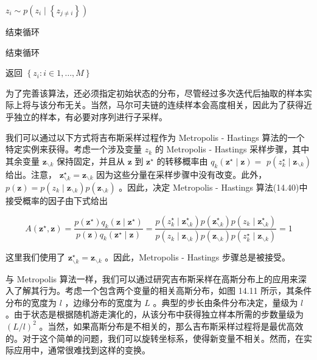 \documentclass[10pt]{article}
\begin{document}
\({z}_{i} \sim  p\left( {{z}_{i} \mid  \left\{  {z}_{j \neq  i}\right\}  }\right)\)

结束循环

结束循环

返回 \(\left\{  {{z}_{i} : i \in  1,\ldots ,M}\right\}\)

为了完善该算法，还必须指定初始状态的分布，尽管经过多次迭代后抽取的样本实际上将与该分布无关。当然，马尔可夫链的连续样本会高度相关，因此为了获得近乎独立的样本，有必要对序列进行子采样。

我们可以通过以下方式将吉布斯采样过程作为 Metropolis - Hastings 算法的一个特定实例来获得。考虑一个涉及变量 \({z}_{k}\) 的 Metropolis - Hastings 采样步骤，其中其余变量 \({\mathbf{z}}_{\smallsetminus k}\) 保持固定，并且从 \(\mathbf{z}\) 到 \({\mathbf{z}}^{ \star  }\) 的转移概率由 \({q}_{k}\left( {{\mathbf{z}}^{ \star  } \mid  \mathbf{z}}\right)  =\)  \(p\left( {{z}_{k}^{ \star  } \mid  {\mathbf{z}}_{\smallsetminus k}}\right)\) 给出。注意， \({\mathbf{z}}_{\smallsetminus k}^{ \star  } = {\mathbf{z}}_{\smallsetminus k}\) 因为这些分量在采样步骤中没有改变。此外， \(p\left( \mathbf{z}\right)  = p\left( {{z}_{k} \mid  {\mathbf{z}}_{\smallsetminus k}}\right) p\left( {\mathbf{z}}_{\smallsetminus k}\right)\) 。因此，决定 Metropolis - Hastings 算法(14.40)中接受概率的因子由下式给出

\[
A\left( {{\mathbf{z}}^{ \star  },\mathbf{z}}\right)  = \frac{p\left( {\mathbf{z}}^{ \star  }\right) {q}_{k}\left( {\mathbf{z} \mid  {\mathbf{z}}^{ \star  }}\right) }{p\left( \mathbf{z}\right) {q}_{k}\left( {{\mathbf{z}}^{ \star  } \mid  \mathbf{z}}\right) } = \frac{p\left( {{z}_{k}^{ \star  } \mid  {\mathbf{z}}_{\smallsetminus k}^{ \star  }}\right) p\left( {\mathbf{z}}_{\smallsetminus k}^{ \star  }\right) p\left( {{z}_{k} \mid  {\mathbf{z}}_{\smallsetminus k}^{ \star  }}\right) }{p\left( {{z}_{k} \mid  {\mathbf{z}}_{\smallsetminus k}}\right) p\left( {\mathbf{z}}_{\smallsetminus k}\right) p\left( {{z}_{k}^{ \star  } \mid  {\mathbf{z}}_{\smallsetminus k}}\right) } = 1 \tag{14.45}
\]

这里我们使用了 \({\mathbf{z}}_{\smallsetminus k}^{ \star  } = {\mathbf{z}}_{\smallsetminus k}\) 。因此，Metropolis - Hastings 步骤总是被接受。

与 Metropolis 算法一样，我们可以通过研究吉布斯采样在高斯分布上的应用来深入了解其行为。考虑一个包含两个变量的相关高斯分布，如图 14.11 所示，其条件分布的宽度为 \(l\) ，边缘分布的宽度为 \(L\) 。典型的步长由条件分布决定，量级为 \(l\) 。由于状态是根据随机游走演化的，从该分布中获得独立样本所需的步数量级为 \({\left( L/l\right) }^{2}\) 。当然，如果高斯分布是不相关的，那么吉布斯采样过程将是最优高效的。对于这个简单的问题，我们可以旋转坐标系，使得新变量不相关。然而，在实际应用中，通常很难找到这样的变换。
\end{document}
